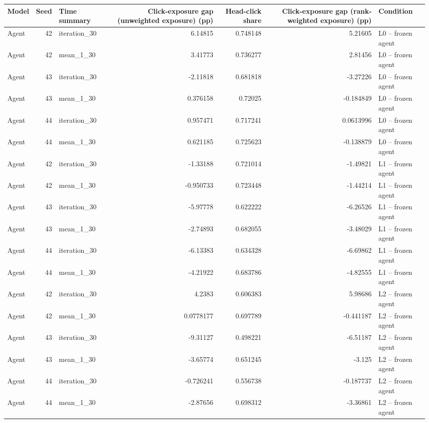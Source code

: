 \begin{table}[htbp!]
\centering
\small
\setlength{\tabcolsep}{3pt}
\renewcommand{\arraystretch}{1.1}
\begin{tabular}{lrlrrrl}
\hline
Model & Seed & Time summary & Click-exposure gap (unweighted exposure) (pp) & Head-click share & Click-exposure gap (rank-weighted exposure) (pp) & Condition \\
\hline
Agent & 42 & iteration\_30 & 6.14815 & 0.748148 & 5.21605 & L0 -- frozen agent \\
Agent & 42 & mean\_1\_30 & 3.41773 & 0.736277 & 2.81456 & L0 -- frozen agent \\
Agent & 43 & iteration\_30 & -2.11818 & 0.681818 & -3.27226 & L0 -- frozen agent \\
Agent & 43 & mean\_1\_30 & 0.376158 & 0.72025 & -0.184849 & L0 -- frozen agent \\
Agent & 44 & iteration\_30 & 0.957471 & 0.717241 & 0.0613996 & L0 -- frozen agent \\
Agent & 44 & mean\_1\_30 & 0.621185 & 0.725623 & -0.138879 & L0 -- frozen agent \\
Agent & 42 & iteration\_30 & -1.33188 & 0.721014 & -1.49821 & L1 -- frozen agent \\
Agent & 42 & mean\_1\_30 & -0.950733 & 0.723448 & -1.44214 & L1 -- frozen agent \\
Agent & 43 & iteration\_30 & -5.97778 & 0.622222 & -6.26526 & L1 -- frozen agent \\
Agent & 43 & mean\_1\_30 & -2.74893 & 0.682055 & -3.48029 & L1 -- frozen agent \\
Agent & 44 & iteration\_30 & -6.13383 & 0.634328 & -6.69862 & L1 -- frozen agent \\
Agent & 44 & mean\_1\_30 & -4.21922 & 0.683786 & -4.82555 & L1 -- frozen agent \\
Agent & 42 & iteration\_30 & 4.2383 & 0.606383 & 5.98686 & L2 -- frozen agent \\
Agent & 42 & mean\_1\_30 & 0.0778177 & 0.697789 & -0.441187 & L2 -- frozen agent \\
Agent & 43 & iteration\_30 & -9.31127 & 0.498221 & -6.51187 & L2 -- frozen agent \\
Agent & 43 & mean\_1\_30 & -3.65774 & 0.651245 & -3.125 & L2 -- frozen agent \\
Agent & 44 & iteration\_30 & -0.726241 & 0.556738 & -0.187737 & L2 -- frozen agent \\
Agent & 44 & mean\_1\_30 & -2.87656 & 0.698312 & -3.36861 & L2 -- frozen agent \\

\end{tabular}
\end{table}
